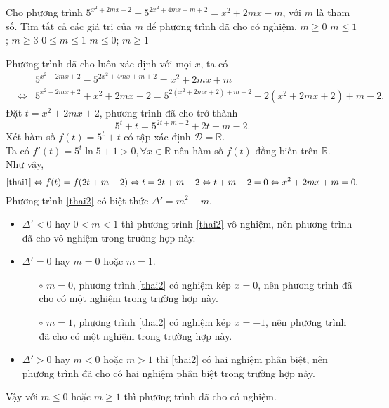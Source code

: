 \begin{ex}%
	Cho phương trình $5^{x^2+2mx+2}-5^{2x^2+4mx+m+2}=x^2+2mx+m$, với $m$ là tham số. Tìm tất cả các giá trị của $m$ để phương trình đã cho có nghiệm.
	\choice
	{$m\geq 0$}
	{$m\leq 1$; $m\geq 3$}
	{$0\leq m \leq 1$}
	{\True $m\leq 0$; $m\geq 1$}
	\loigiai
	{
		Phương trình đã cho luôn xác định với mọi $x$, ta có
		\begin{eqnarray*}
			& & 5^{x^2+2mx+2}-5^{2x^2+4mx+m+2}=x^2+2mx+m\\
			&\Leftrightarrow & 5^{x^2+2mx+2}+x^2+2mx+2=5^{2(x^2+2mx+2)+m-2}+2(x^2+2mx+2)+m-2.
		\end{eqnarray*}
		Đặt $t=x^2+2mx+2$, phương trình đã cho trở thành
		\begin{equation}
		5^t+t=5^{2t+m-2}+2t+m-2. \label{thai1}
		\end{equation}
		Xét hàm số $f(t)=5^t+t$ có tập xác định $\mathscr{D}=\mathbb{R}$.\\
		Ta có $f'(t)=5^t\ln5+1>0,\forall x\in\mathbb{R}$ nên hàm số $f(t)$ đồng biến trên $\mathbb{R}$.\\
		Như vậy,
		\begin{equation}
		\eqref{thai1}\Leftrightarrow f(t)=f(2t+m-2) \Leftrightarrow t=2t+m-2 \Leftrightarrow t+m-2=0 \Leftrightarrow x^2+2mx+m=0. \label{thai2}
		\end{equation}
		Phương trình \eqref{thai2} có biệt thức $\Delta'=m^2-m$.
		\begin{itemize}
			\item $\Delta'<0$ hay $0<m<1$ thì phương trình \eqref{thai2} vô nghiệm, nên phương trình đã cho vô nghiệm trong trường hợp này.
			\item $\Delta'=0$ hay $m=0$ hoặc $m=1$.
			\begin{itemize}
				\item[$\circ$] $m=0$, phương trình \eqref{thai2} có nghiệm kép $x=0$, nên phương trình đã cho có một nghiệm trong trường hợp này.
				\item[$\circ$] $m=1$, phương trình \eqref{thai2} có nghiệm kép $x=-1$, nên phương trình đã cho có một nghiệm trong trường hợp này.
			\end{itemize}
			\item $\Delta'>0$ hay $m<0$ hoặc $m>1$ thì \eqref{thai2} có hai nghiệm phân biệt, nên phương trình đã cho có hai nghiệm phân biệt trong trường hợp này.
		\end{itemize}
		Vậy với $m\leq 0$ hoặc $m\geq 1$ thì phương trình đã cho có nghiệm.
	}
\end{ex}

